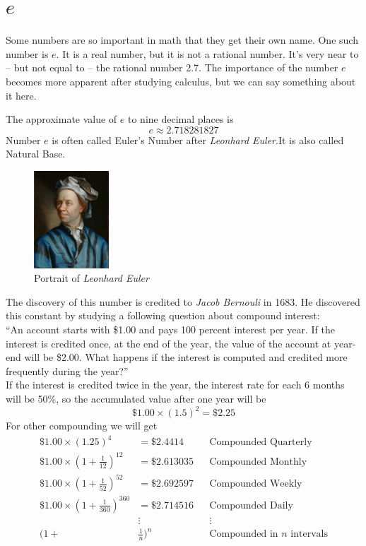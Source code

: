 \section{\texorpdfstring{$e$}{TEXT}}%
Some numbers are so important in math that they get their own name. One such number is $e$. It is
a real number, but it is not a rational number. It’s very near to – but not equal to – the
rational number 2.7. The importance of the number $e$ becomes more apparent after studying
calculus, but we can say something about it here.

The approximate value of $e$ to nine decimal places is
	\[
		e \approx 2.718281827
	\]
Number $e$ is often called Euler’s Number after \textit{Leonhard Euler}.It is also called Natural Base. 

		\begin{figure}
		 \centering
		 \includegraphics[width=0.25\textwidth]{pics/euler.jpg}
		 \caption{Portrait of \textit{Leonhard Euler}}
		 \label{fig:euler}
		\end{figure}
%
The discovery of this number is credited to \textit{Jacob
Bernouli} in 1683. He discovered this constant by studying a following question about compound interest:\\ 
%
	“An account starts with \$1.00 and pays 100 percent interest per year. If the interest is
	credited once, at the end of the year, the value of the account at year-end will be \$2.00.
	What happens if the interest is computed and credited more frequently during the year?” \\
%
If the interest is credited twice in the year, the interest rate for each 6 months will be 50\%,
so the accumulated value after one year will be
	\[ 
		\$1.00\times(1.5)^2=\$2.25
    \]
For other compounding we will get
	\begin{align*}
	\$1.00\times(1.25)^4 &= \$2.4414		&	&\text{Compounded Quarterly}\\
	\$1.00\times(1+\frac{1}{12})^{12} &= \$2.613035 & &\text{Compounded Monthly}\\
	\$1.00\times(1+\frac{1}{52})^{52} &= \$2.692597 & &\text{Compounded Weekly}\\
	\$1.00\times(1+\frac{1}{360})^{360} &= \$2.714516 & &\text{Compounded Daily}\\
	&\vdots	&	&\vdots \\
	(1+&\frac{1}{n})^n & &\text{Compounded in $n$ intervals}
	\end{align*}


